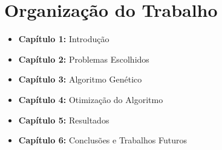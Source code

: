 \section{Organização do Trabalho}

\begin{itemize}
	\item \textbf{Capítulo 1:} Introdução
	\item \textbf{Capítulo 2:} Problemas Escolhidos
	\item \textbf{Capítulo 3:} Algoritmo Genético
	\item \textbf{Capítulo 4:} Otimização do Algoritmo
	\item \textbf{Capítulo 5:} Resultados
	\item \textbf{Capítulo 6:} Conclusões e Trabalhos Futuros
\end{itemize}
